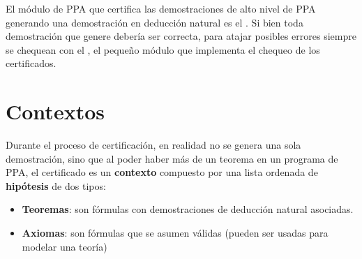 
El módulo de PPA que certifica las demostraciones de alto nivel de PPA
generando una demostración en deducción natural es el \modCertifier{}. Si
bien toda demostración que genere debería ser correcta, para atajar posibles
errores siempre se chequean con el \modChecker{}, el pequeño módulo que implementa el chequeo de los certificados.

\section{Contextos}

Durante el proceso de certificación, en realidad no se genera una sola
demostración, sino que al poder haber más de un teorema en
un programa de PPA, el certificado es un \textbf{contexto} compuesto por una
lista ordenada de \textbf{hipótesis} de dos tipos:

\begin{itemize}
    \item \textbf{Teoremas}: son fórmulas con demostraciones de deducción natural
    asociadas.
    \item \textbf{Axiomas}: son fórmulas que se asumen válidas (pueden ser usadas para
    modelar una teoría)
\end{itemize}

